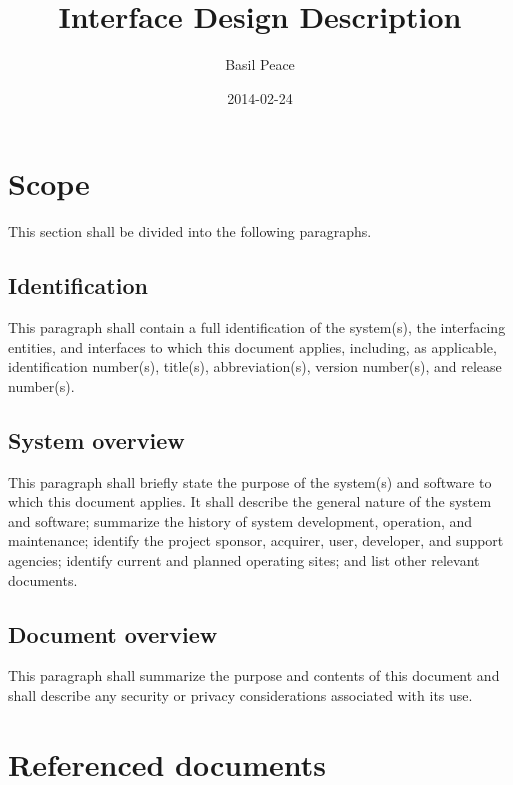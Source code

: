 \documentclass{fidata-report-template}
\begin{document}
\frontmatter

\title{Interface Design Description}

\date{2014-02-24}

\author{Basil Peace}

\maketitle
\tableofcontents

\section{Scope}

This section shall be divided into the following paragraphs.

\subsection{Identification}

This paragraph shall contain a full identification of the system(s), the
interfacing entities, and interfaces to which this document applies,
including, as applicable, identification number(s), title(s),
abbreviation(s), version number(s), and release number(s).

\subsection{System overview}

This paragraph shall briefly state the purpose of the system(s) and
software to which this document applies. It shall describe the general
nature of the system and software; summarize the history of system
development, operation, and maintenance; identify the project sponsor,
acquirer, user, developer, and support agencies; identify current and
planned operating sites; and list other relevant documents.

\subsection{Document overview}

This paragraph shall summarize the purpose and contents of this document
and shall describe any security or privacy considerations associated
with its use.

\section{Referenced documents}
\end{document}
